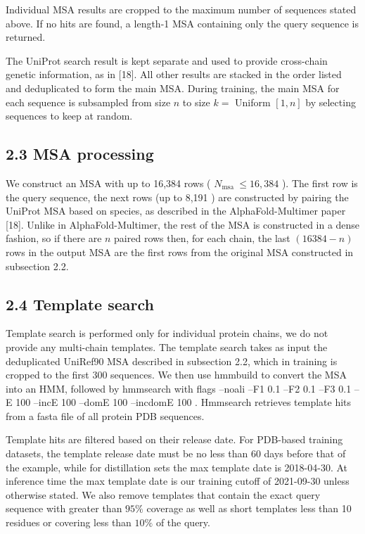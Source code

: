 \documentclass[10pt]{article}
\begin{document}
Individual MSA results are cropped to the maximum number of sequences stated above. If no hits are found, a length-1 MSA containing only the query sequence is returned.

The UniProt search result is kept separate and used to provide cross-chain genetic information, as in [18]. All other results are stacked in the order listed and deduplicated to form the main MSA. During training, the main MSA for each sequence is subsampled from size $n$ to size $k=$ Uniform $[1, n]$ by selecting sequences to keep at random.

\subsection*{2.3 MSA processing}
We construct an MSA with up to 16,384 rows ( $N_{\text {msa }} \leq 16,384$ ). The first row is the query sequence, the next rows (up to 8,191 ) are constructed by pairing the UniProt MSA based on species, as described in the AlphaFold-Multimer paper [18]. Unlike in AlphaFold-Multimer, the rest of the MSA is constructed in a dense fashion, so if there are $n$ paired rows then, for each chain, the last $(16384-n)$ rows in the output MSA are the first rows from the original MSA constructed in subsection 2.2.

\subsection*{2.4 Template search}
Template search is performed only for individual protein chains, we do not provide any multi-chain templates. The template search takes as input the deduplicated UniRef90 MSA described in subsection 2.2, which in training is cropped to the first 300 sequences. We then use hmmbuild to convert the MSA into an HMM, followed by hmmsearch with flags --noali --F1 0.1 --F2 0.1 --F3 0.1 --E 100 --incE 100 --domE 100 --incdomE 100 . Hmmsearch retrieves template hits from a fasta file of all protein PDB sequences.

Template hits are filtered based on their release date. For PDB-based training datasets, the template release date must be no less than 60 days before that of the example, while for distillation sets the max template date is 2018-04-30. At inference time the max template date is our training cutoff of 2021-09-30 unless otherwise stated. We also remove templates that contain the exact query sequence with greater than $95 \%$ coverage as well as short templates less than 10 residues or covering less than $10 \%$ of the query.
\end{document}
